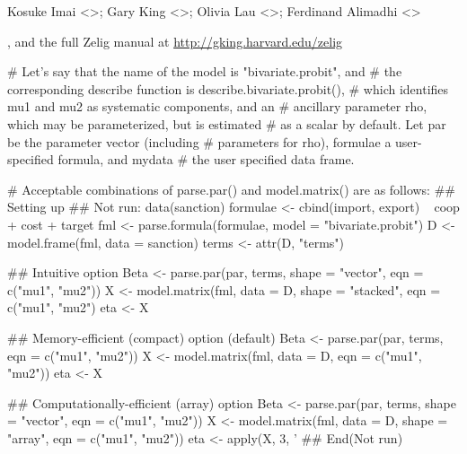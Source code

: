 \begin{Author}\relax
Kosuke Imai <>; Gary King
<>; Olivia Lau <>; Ferdinand Alimadhi
<>
\end{Author}
\begin{SeeAlso}\relax
{},  and the full Zelig manual at
\url{http://gking.harvard.edu/zelig}
\end{SeeAlso}
\begin{Examples}
\begin{ExampleCode}
# Let's say that the name of the model is "bivariate.probit", and
# the corresponding describe function is describe.bivariate.probit(), 
# which identifies mu1 and mu2 as systematic components, and an 
# ancillary parameter rho, which may be parameterized, but is estimated 
# as a scalar by default.  Let par be the parameter vector (including 
# parameters for rho), formulae a user-specified formula, and mydata
# the user specified data frame.  

# Acceptable combinations of parse.par() and model.matrix() are as follows:
## Setting up
## Not run: 
data(sanction)
formulae <- cbind(import, export) ~ coop + cost + target
fml <- parse.formula(formulae, model = "bivariate.probit")
D <- model.frame(fml, data = sanction)
terms <- attr(D, "terms")

## Intuitive option
Beta <- parse.par(par, terms, shape = "vector", eqn = c("mu1", "mu2"))
X <- model.matrix(fml, data = D, shape = "stacked", eqn = c("mu1", "mu2")
eta <- X 

## Memory-efficient (compact) option (default)
Beta <- parse.par(par, terms, eqn = c("mu1", "mu2"))    
X <- model.matrix(fml, data = D, eqn = c("mu1", "mu2"))
eta <- X 

## Computationally-efficient (array) option
Beta <- parse.par(par, terms, shape = "vector", eqn = c("mu1", "mu2"))
X <- model.matrix(fml, data = D, shape = "array", eqn = c("mu1", "mu2"))
eta <- apply(X, 3, '
## End(Not run)\end{ExampleCode}
\end{Examples}


